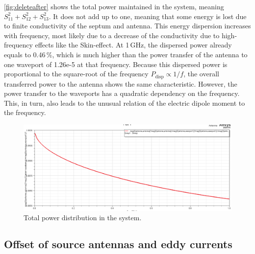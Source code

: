 \autoref{fig:deleteafter} shows the total power maintained in the system, meaning $S_{11}^2+S_{12}^2+S_{13}^2$. It does not add up to one, meaning that some energy is lost due to finite conductivity of the septum and antenna. This energy dispersion increases with frequency, most likely due to a decrease of the conductivity due to high-frequency effects like the Skin-effect. At 1\,GHz, the dispersed power already equals to 0.46\,\%, which is much higher than the power transfer of the antenna to one waveport of 1.26e-5 at that frequency. Because this dispersed power is proportional to the square-root of the frequency $P_\mathrm{disp}\propto 1/f$, the overall transferred power to the antenna shows the same characteristic. However, the power transfer to the waveports has a quadratic dependency on the frequency. This, in turn, also leads to the unusual relation of the electric dipole moment to the frequency. 

\begin{figure}[h]
	\centering
	\includegraphics[width=0.7\linewidth]{content/30_simulations/img/delete_after}
	\caption{Total power distribution in the system.}
	\label{fig:deleteafter}
\end{figure}


\subsection{Offset of source antennas and eddy currents}

